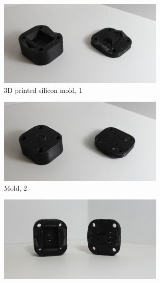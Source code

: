 \begin{figure}
    \centering
    \begin{subfigure}{.45\linewidth}
        \centering
    \includegraphics[width=0.9\textwidth]{Images/mold/mold.png}
        \caption{3D printed silicon mold, 1}
        \label{fig:mold}
    \end{subfigure}
    \begin{subfigure}{.45\linewidth}
        \centering
        \includegraphics[width=0.9\textwidth]{Images/mold/moldinverted.png}
        \caption{Mold, 2}
        \label{fig:MoldInverted}
    \end{subfigure}
    \begin{subfigure}{.45\linewidth}
        \centering
    \includegraphics[width=0.9\textwidth]{Images/mold/moldstanding.png}

\end{subfigure}
\end{figure}
